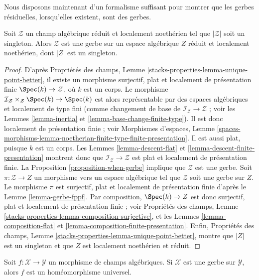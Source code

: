 \noindent
Nous disposons maintenant d'un formalisme suffisant pour montrer que les
gerbes résiduelles, lorsqu'elles existent, sont des gerbes.

\begin{lemma}
\label{lemma-noetherian-singleton-stack-gerbe}
Soit $\mathcal{Z}$ un champ algébrique réduit et localement noethérien tel que
$|\mathcal{Z}|$ soit un singleton. Alors $\mathcal{Z}$ est une gerbe sur
un espace algébrique $Z$ réduit et localement noethérien, dont $|Z|$ est un
singleton.
\end{lemma}

\begin{proof}
D'après Propriétés des champs, Lemme
\ref{stacks-properties-lemma-unique-point-better}, il existe un morphisme
surjectif, plat et localement de présentation finie
$\Spec(k) \to \mathcal{Z}$, où $k$ est un corps. Le morphisme
$\mathcal{I}_\mathcal{Z} \times_\mathcal{Z} \Spec(k) \to \Spec(k)$ est alors
représentable par des espaces algébriques et localement de type fini (comme
changement de base de $\mathcal{I}_\mathcal{Z} \to \mathcal{Z}$ ; voir les
Lemmes \ref{lemma-inertia} et \ref{lemma-base-change-finite-type}). Il est donc
localement de présentation finie ; voir Morphismes d'espaces, Lemme
\ref{spaces-morphisms-lemma-noetherian-finite-type-finite-presentation}.
Il est aussi plat, puisque $k$ est un corps. Les
Lemmes \ref{lemma-descent-flat} et
\ref{lemma-descent-finite-presentation} montrent donc que
$\mathcal{I}_\mathcal{Z} \to \mathcal{Z}$ est plat et localement de
présentation finie. La Proposition \ref{proposition-when-gerbe} implique que
$\mathcal{Z}$ est une gerbe. Soit $\pi : \mathcal{Z} \to Z$ un morphisme vers
un espace algébrique tel que $\mathcal{Z}$ soit une gerbe sur $Z$.
Le morphisme $\pi$ est surjectif, plat et localement de présentation finie
d'après le Lemme \ref{lemma-gerbe-fppf}. Par composition,
$\Spec(k) \to Z$ est donc surjectif, plat et localement de présentation finie ;
voir Propriétés des champs, Lemme
\ref{stacks-properties-lemma-composition-surjective}, et les
Lemmes \ref{lemma-composition-flat} et
\ref{lemma-composition-finite-presentation}. Enfin, Propriétés des champs,
Lemme \ref{stacks-properties-lemma-unique-point-better}, montre que $|Z|$ est
un singleton et que $Z$ est localement noethérien et réduit.
\end{proof}

\begin{lemma}
\label{lemma-gerbe-bijection-points}
Soit $f : \mathcal{X} \to \mathcal{Y}$ un morphisme de champs algébriques.
Si $\mathcal{X}$ est une gerbe sur $\mathcal{Y}$, alors $f$ est un
homéomorphisme universel.
\end{lemma}

